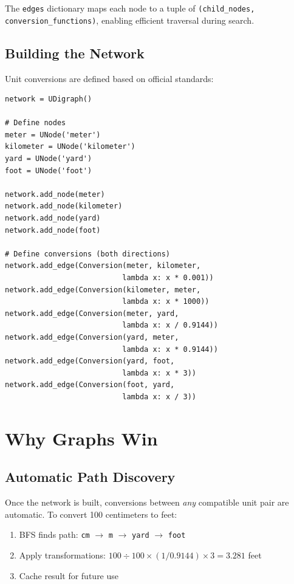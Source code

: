 \documentclass[11pt,a4paper]{report}
\begin{document}
The \texttt{edges} dictionary maps each node to a tuple of \texttt{(child\_nodes, conversion\_functions)}, enabling efficient traversal during search.

\subsection{Building the Network}

Unit conversions are defined based on official standards:

\begin{lstlisting}[style=pythonstyle, caption={Example network construction}]
network = UDigraph()

# Define nodes
meter = UNode('meter')
kilometer = UNode('kilometer')
yard = UNode('yard')
foot = UNode('foot')

network.add_node(meter)
network.add_node(kilometer)
network.add_node(yard)
network.add_node(foot)

# Define conversions (both directions)
network.add_edge(Conversion(meter, kilometer, 
                           lambda x: x * 0.001))
network.add_edge(Conversion(kilometer, meter, 
                           lambda x: x * 1000))
network.add_edge(Conversion(meter, yard, 
                           lambda x: x / 0.9144))
network.add_edge(Conversion(yard, meter, 
                           lambda x: x * 0.9144))
network.add_edge(Conversion(yard, foot, 
                           lambda x: x * 3))
network.add_edge(Conversion(foot, yard, 
                           lambda x: x / 3))
\end{lstlisting}

\section{Why Graphs Win}

\subsection{Automatic Path Discovery}

Once the network is built, conversions between \emph{any} compatible unit pair are automatic. To convert 100 centimeters to feet:
\begin{enumerate}[leftmargin=*]
  \item BFS finds path: \texttt{cm} $\rightarrow$ \texttt{m} $\rightarrow$ \texttt{yard} $\rightarrow$ \texttt{foot}
  \item Apply transformations: $100 \div 100 \times (1/0.9144) \times 3 = 3.281$ feet
  \item Cache result for future use
\end{enumerate}
\end{document}
